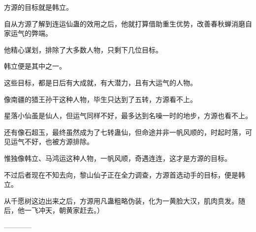 \begin{this_body}
方源的目标就是韩立。

自从方源了解到连运仙蛊的效用之后，他就打算借助重生优势，改善春秋蝉消磨自家运气的弊端。

他精心谋划，排除了大多数人物，只剩下几位目标。

韩立便是其中之一。

这些目标，都是日后有大成就，有大潜力，且有大运气的人物。

像南疆的猎王孙干这种人物，毕生只达到了五转，方源看不上。

星落小仙虽是仙人，但运气同样不好，最多达到名噪一时的地步，方源也看不上。

还有像石超玉，最终虽然成为了七转蛊仙，但命途并非一帆风顺的，时起时落，可见运气不好，也被方源排除。

惟独像韩立、马鸿运这种人物，一帆风顺，奇遇连连，这才是方源的目标。

不过后者现在不知去向，黎山仙子正在全力调查，方源首选动手的目标，便是韩立。

从千愿树这边出来之后，方源用凡蛊粗略伪装，化为一黄脸大汉，肌肉贲发。随后，他一飞冲天，朝黄家赶去。）

------------

\end{this_body}

